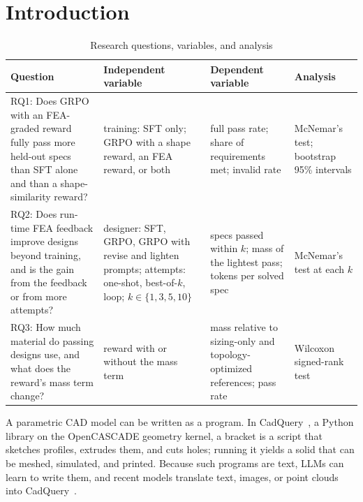 \documentclass[conference]{IEEEtran}
\begin{document}
\section{Introduction}

\begin{table}[t]
\caption{Research questions, variables, and analysis}
\label{tab:rq}
\centering\footnotesize
\begin{tabular}{@{}L{0.32\textwidth}L{0.25\textwidth}L{0.22\textwidth}L{0.13\textwidth}@{}}
\toprule
Question & Independent variable & Dependent variable & Analysis\\
\midrule
RQ1: Does GRPO with an FEA-graded reward fully pass more held-out specs than SFT alone and than a
shape-similarity reward?
& training: SFT only; GRPO with a shape reward, an FEA reward, or both
& full pass rate; share of requirements met; invalid rate
& McNemar's test; bootstrap 95\% intervals\\
\addlinespace
RQ2: Does run-time FEA feedback improve designs beyond training, and is the gain from the feedback or
from more attempts?
& designer: SFT, GRPO, GRPO with revise and lighten prompts; attempts: one-shot, best-of-$k$, loop;
$k\in\{1,3,5,10\}$
& specs passed within $k$; mass of the lightest pass; tokens per solved spec
& McNemar's test at each $k$\\
\addlinespace
RQ3: How much material do passing designs use, and what does the reward's mass term change?
& reward with or without the mass term
& mass relative to sizing-only and topology-optimized references; pass rate
& Wilcoxon signed-rank test\\
\bottomrule
\end{tabular}
\end{table}

A parametric CAD model can be written as a program. In CadQuery~\cite{cadquery}, a Python library on the
OpenCASCADE geometry kernel, a bracket is a script that sketches profiles, extrudes them, and cuts holes;
running it yields a solid that can be meshed, simulated, and printed. Because such programs are text,
LLMs can learn to write them, and recent models translate text, images, or point clouds into
CadQuery~\cite{rukhovich2024cadrecode,guan2025cadcoder,kolodiazhnyi2026cadrille}.
\end{document}
